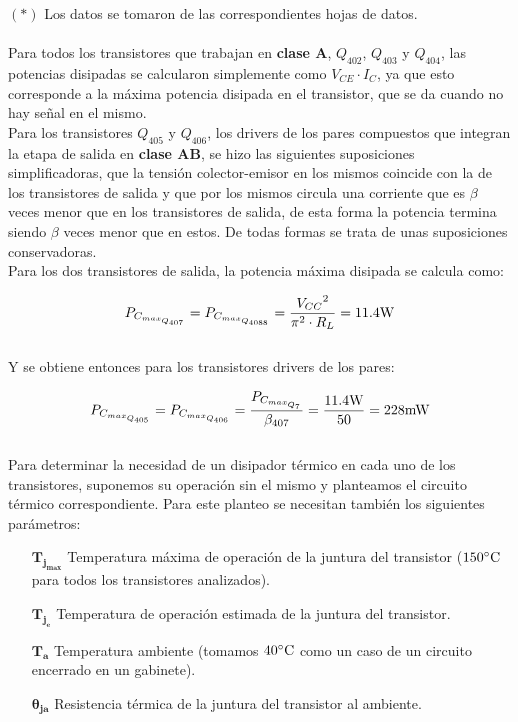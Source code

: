 
\footnotesize{
$\left(*\right)$ Los datos se tomaron de las correspondientes hojas de datos.
}\\\\


Para todos los transistores que trabajan en \textbf{clase A}, $Q_{402}$, $Q_{403}$ y $Q_{404}$, las potencias disipadas se calcularon simplemente como $V_{CE} \cdot I_{C}$, ya que esto corresponde a la máxima potencia disipada en el transistor, que se da cuando no hay señal en el mismo.\\

Para los transistores $Q_{405}$ y $Q_{406}$, los drivers de los pares compuestos que integran la etapa de salida en \textbf{clase AB}, se hizo las siguientes  suposiciones simplificadoras, que la tensión \mbox{colector-emisor} en los mismos coincide con la de los transistores de salida y que por los mismos circula una corriente que es $\beta$ veces menor que en los transistores de salida, de esta forma la potencia termina siendo $\beta$ veces menor que en estos. De todas formas se trata de unas suposiciones conservadoras.\\

Para los dos transistores de salida, la potencia máxima disipada se calcula como:

\begin{equation}
      P_{C_{max_{Q_{407}}}} = P_{C_{max_{Q_{4088}}}} = \frac{{V_{CC}}^2}{{\pi}^2 \cdot R_{L}} = 11.4 \si[per-mode=symbol]{\watt}
\end{equation}\\

Y se obtiene entonces para los transistores drivers de los pares:

\begin{equation}
P_{C_{max_{Q_{405}}}} = P_{C_{max_{Q_{406}}}} = \frac{P_{C_{max_{Q_{7}}}}}{\beta_{407}} = \frac{11.4 \si[per-mode=symbol]{\watt}}{50} = 228 \si[per-mode=symbol]{\milli\watt}
\end{equation}\\

Para determinar la necesidad de un disipador térmico en cada uno de los transistores, suponemos su operación sin el mismo y planteamos el circuito térmico correspondiente. Para este planteo se necesitan también los siguientes parámetros:

\begin{enumerate}
\item[$\bm{T_{j_{max}}}$] Temperatura máxima de operación de la juntura del transistor ($150 \si[per-mode=symbol]{\celsius}$ para todos los transistores analizados).
\item[$\bm{T_{j_{e}}}$] Temperatura de operación estimada de la juntura del transistor.
\item[$\bm{T_{a}}$] Temperatura ambiente (tomamos $40 \si[per-mode=symbol]{\celsius}$ como un caso de un circuito encerrado en un gabinete).
\item[$\bm{\theta_{ja}}$] Resistencia térmica de la juntura del transistor al ambiente.\\
\end{enumerate}



